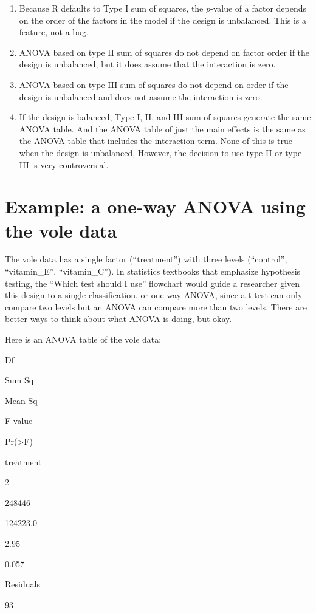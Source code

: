 \documentclass[]{book}
\begin{document}
\begin{enumerate}
\item
  Because R defaults to Type I sum of squares, the \(p\)-value of a
  factor depends on the order of the factors in the model if the design
  is unbalanced. This is a feature, not a bug.
\item
  ANOVA based on type II sum of squares do not depend on factor order if
  the design is unbalanced, but it does assume that the interaction is
  zero.
\item
  ANOVA based on type III sum of squares do not depend on order if the
  design is unbalanced and does not assume the interaction is zero.
\item
  If the design is balanced, Type I, II, and III sum of squares generate
  the same ANOVA table. And the ANOVA table of just the main effects is
  the same as the ANOVA table that includes the interaction term. None
  of this is true when the design is unbalanced, However, the decision
  to use type II or type III is very controversial.
\end{enumerate}

\section{Example: a one-way ANOVA using the vole
data}\label{example-a-one-way-anova-using-the-vole-data}

The vole data has a single factor (``treatment'') with three levels
(``control'', ``vitamin\_E'', ``vitamin\_C''). In statistics textbooks
that emphasize hypothesis testing, the ``Which test should I use''
flowchart would guide a researcher given this design to a single
classification, or one-way ANOVA, since a t-test can only compare two
levels but an ANOVA can compare more than two levels. There are better
ways to think about what ANOVA is doing, but okay.

Here is an ANOVA table of the vole data:

Df

Sum Sq

Mean Sq

F value

Pr(\textgreater{}F)

treatment

2

248446

124223.0

2.95

0.057

Residuals

93
\end{document}
